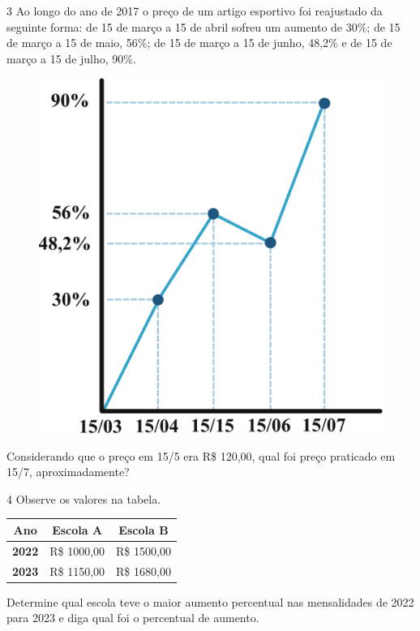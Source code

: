 \pagebreak
\num{3} Ao longo do ano de 2017 o preço de um artigo esportivo foi
reajustado da seguinte forma: de 15 de março a 15 de abril sofreu um
aumento de 30\%; de 15 de março a 15 de maio, 56\%; de 15 de março a 15
de junho, 48,2\% e de 15 de março a 15 de julho, 90\%.

\begin{figure}[htpb!]
\centering
\includegraphics[width=.5\textwidth]{./ilustras-mat/modulo_4-atividade_3.png}
\end{figure}

Considerando que o preço em 15/5 era R\$ 120,00, qual foi preço praticado
em 15/7, aproximadamente?

\begin{emptybox}
\end{emptybox}

\num{4} Observe os valores na tabela. 

\begin{center}
\begin{tabular}{|lll|}
\hline
\multicolumn{1}{|c}{\textbf{Ano}} & \multicolumn{1}{c}{\textbf{Escola A}} & \multicolumn{1}{c|}{\textbf{Escola B}} \\ \hline
\textbf{2022} & R\$ 1000,00 & R\$ 1500,00 \\ \hline
\textbf{2023} & R\$ 1150,00 & R\$ 1680,00 \\ \hline
\end{tabular}
\end{center}

Determine qual escola teve o maior aumento percentual nas mensalidades
de 2022 para 2023 e diga qual foi o percentual de aumento.

